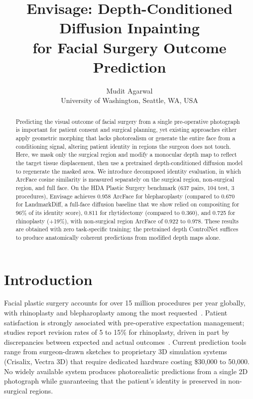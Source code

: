 \documentclass[twocolumn]{article}
\author{Mudit Agarwal\\University of Washington, Seattle, WA, USA}
\date{}
\newcommand{\method}{Envisage}
\begin{document}
\title{\method{}: Depth-Conditioned Diffusion Inpainting\\
for Facial Surgery Outcome Prediction}


\maketitle

\begin{abstract}
Predicting the visual outcome of facial surgery from a single
pre-operative photograph is important for patient consent and surgical
planning, yet existing approaches either apply geometric morphing
that lacks photorealism or generate the entire face from a conditioning
signal, altering patient identity in regions the surgeon does not touch.
Here, we mask only the surgical region and modify a monocular depth map
to reflect the target tissue displacement, then use a pretrained
depth-conditioned diffusion model to regenerate the masked area. We
introduce decomposed identity evaluation, in which ArcFace cosine
similarity is measured separately on the surgical region, non-surgical
region, and full face. On the HDA Plastic Surgery benchmark (637 pairs,
104 test, 3 procedures), \method{} achieves 0.958 ArcFace for blepharoplasty
(compared to 0.670 for LandmarkDiff, a full-face diffusion baseline that
we show relied on compositing for 96\% of its identity score), 0.811
for rhytidectomy (compared to 0.360), and 0.725 for rhinoplasty (+19\%),
with non-surgical region ArcFace of 0.922 to 0.978. These results are obtained with zero task-specific
training; the pretrained depth ControlNet suffices to produce
anatomically coherent predictions from modified depth maps alone.

\end{abstract}

\section{Introduction}
\label{sec:intro}

Facial plastic surgery accounts for over 15 million procedures per
year globally, with rhinoplasty and blepharoplasty among the most
requested~\cite{asps2023stats}. Patient satisfaction is strongly
associated with pre-operative expectation management; studies report
revision rates of 5 to 15\% for rhinoplasty, driven in part by
discrepancies between expected and actual
outcomes~\cite{honigman2004review,sarwer2008body}. Current prediction
tools range from surgeon-drawn sketches to proprietary 3D simulation
systems (Crisalix, Vectra 3D) that require dedicated hardware costing
\$30,000 to 50,000. No widely available system produces photorealistic
predictions from a single 2D photograph while guaranteeing that the
patient's identity is preserved in non-surgical regions.
\end{document}
